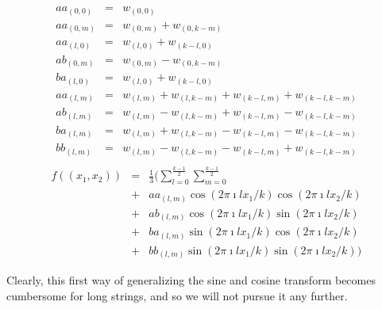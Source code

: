 \begin{eqnarray}
aa_{(0,0)} &=& w_{(0,0)} \nonumber \\
aa_{(0,m)} &=& w_{(0,m)} + w_{(0,k-m)} \nonumber \\
aa_{(l,0)} &=& w_{(l,0)} + w_{(k-l,0)} \nonumber \\
ab_{(0,m)} &=& w_{(0,m)} - w_{(0,k-m)} \nonumber \\
ba_{(l,0)} &=& w_{(l,0)} + w_{(k-l,0)} \nonumber \\
aa_{(l,m)} &=& w_(l,m) + w_(l,k-m) + w_(k-l,m) + w_(k-l,k-m) \nonumber \\
ab_{(l,m)} &=& w_(l,m) - w_(l,k-m) + w_(k-l,m) - w_(k-l,k-m) \nonumber \\
ba_{(l,m)} &=& w_(l,m) + w_(l,k-m) - w_(k-l,m) - w_(k-l,k-m) \nonumber \\
bb_{(l,m)} &=& w_(l,m) - w_(l,k-m) - w_(k-l,m) + w_(k-l,k-m) \nonumber \\
\end{eqnarray}
\begin{eqnarray}
f((x_1,x_2))  &=& \frac{1}{3}( \sum_{l=0}^{\frac{k-1}{2}} {
	\sum_{m=0}^{\frac{k-1}{2}} {}}\nonumber \\
&+& aa_{(l,m)} \cos(2 \pi \imath l x_1/k) \cos(2 \pi \imath l x_2/k)\nonumber \\
&+& ab_{(l,m)} \cos(2 \pi \imath l x_1/k) \sin(2 \pi \imath l x_2/k)\nonumber\\
&+& ba_{(l,m)} \sin(2 \pi \imath l x_1/k) \cos(2 \pi \imath l x_2/k)\nonumber\\
&+& bb_{(l,m)} \sin(2 \pi \imath l x_1/k) \sin(2 \pi \imath l x_2/k)
)
\end{eqnarray}

Clearly, this first way of generalizing the sine and cosine transform becomes 
cumbersome for long strings, and so we will not pursue it any further.

